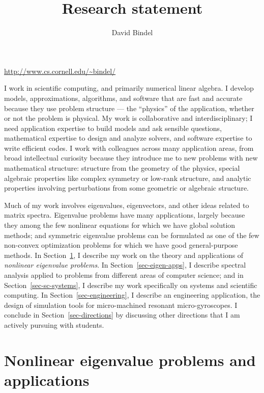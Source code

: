 \documentclass[11pt]{amsart}
\title{Research statement}
\author{David Bindel}
\begin{document}
\maketitle
\vspace{-5mm}
\begin{center}
\url{http://www.cs.cornell.edu/~bindel/}
\end{center}
\vspace{+5mm}

I work in scientific computing, and primarily numerical linear algebra.
%
I develop models, approximations, algorithms, and software that
are fast and accurate because they use problem structure --- the
``physics'' of the application, whether or not the problem is physical.
%
My work is collaborative and interdisciplinary; I need
application expertise to build models and ask sensible questions,
mathematical expertise to design and analyze solvers,
and software expertise to write efficient codes.
%
I work with colleagues across many application areas, from
broad intellectual curiosity because they introduce me to new
problems with new mathematical structure:
%
structure from the geometry of the physics,
special algebraic properties like complex symmetry or
low-rank structure, and
analytic properties involving perturbations from some geometric or
algebraic structure.

Much of my work involves eigenvalues, eigenvectors, and other
ideas related to matrix spectra.
%
Eigenvalue problems have many applications, largely because they among
the few nonlinear equations for which we have global solution methods;
and symmetric eigenvalue problems can be formulated as one of the few
non-convex optimization problems for which we have good general-purpose
methods.
%
In Section~\ref{sec-nep}, I describe my work on the theory and
applications of {\em nonlinear eigenvalue problems}.
%
In Section~\ref{sec-eigen-apps}, I describe spectral analysis applied to
problems from different areas of computer science; and in
Section~\ref{sec-sc-systems}, I describe my work specifically on systems
and scientific computing. In Section~\ref{sec-engineering}, I describe
an engineering application, the design of simulation tools for
micro-machined resonant micro-gyroscopes. I conclude in
Section~\ref{sec-directions} by discussing other directions
that I am actively pursuing with students.

\section{Nonlinear eigenvalue problems and applications}
\label{sec-nep}
\end{document}
